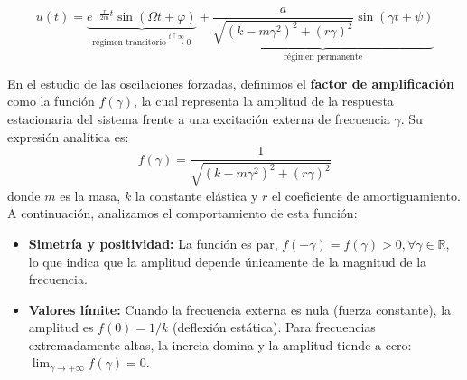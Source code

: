 \[
    u(t) = \underbrace{e^{-\frac{r}{2m} t} \sin(\Omega t + \varphi)}_{\text{régimen transitorio} \xrightarrow{t \uparrow \infty}0} + \underbrace{\frac{a}{\sqrt{(k - m \gamma^2)^2 + (r \gamma)^2}} \sin(\gamma t + \psi)}_{\text{régimen permanente}}
\]

En el estudio de las oscilaciones forzadas, definimos el \textbf{factor de amplificación} como la función $f(\gamma)$, la cual representa la amplitud de la respuesta estacionaria del sistema frente a una excitación externa de frecuencia $\gamma$. Su expresión analítica es:
\[ f(\gamma) = \frac{1}{\sqrt{(k - m \gamma^2)^2 + (r \gamma)^2}} \]
donde $m$ es la masa, $k$ la constante elástica y $r$ el coeficiente de amortiguamiento. A continuación, analizamos el comportamiento de esta función:

\begin{itemize}
    \item \textbf{Simetría y positividad:} La función es par, $f(-\gamma) = f(\gamma) > 0, \forall \gamma \in \mathbb{R}$, lo que indica que la amplitud depende únicamente de la magnitud de la frecuencia.
    \item \textbf{Valores límite:} Cuando la frecuencia externa es nula (fuerza constante), la amplitud es $f(0) = 1/k$ (deflexión estática). Para frecuencias extremadamente altas, la inercia domina y la amplitud tiende a cero: $\lim_{\gamma \to +\infty} f(\gamma) = 0$.
\end{itemize}

\begin{center}
\end{center}

